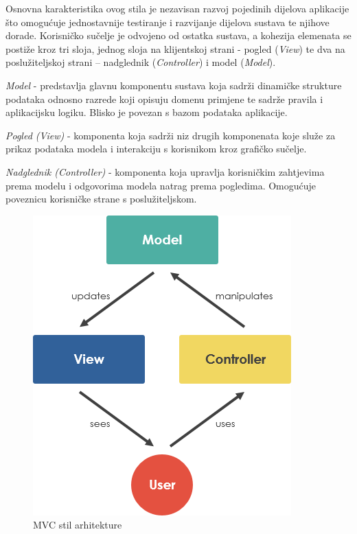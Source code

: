 		Osnovna	karakteristika ovog stila je	nezavisan razvoj	pojedinih dijelova aplikacije što omogućuje jednostavnije testiranje	i razvijanje dijelova sustava te	njihove	dorade.	
Korisničko	sučelje	je	odvojeno od	ostatka	sustava, a kohezija	elemenata se	postiže	kroz	
tri	sloja, jednog sloja	na klijentskoj strani - pogled (\textit{View}) te dva na	poslužiteljskoj	strani	
– nadglednik	(\textit{Controller})	i	model	(\textit{Model}).

		\begin{packed_enum}
			\item\textit{Model} - predstavlja glavnu komponentu sustava koja sadrži dinamičke strukture podataka odnosno razrede koji opisuju domenu primjene te sadrže pravila i aplikacijsku logiku. Blisko je povezan s bazom podataka aplikacije.
			\item\textit{Pogled (View)} - komponenta koja sadrži niz drugih komponenata koje služe za prikaz podataka modela i interakciju s korisnikom kroz grafičko sučelje.
			\item\textit{Nadglednik (Controller)} - komponenta koja upravlja korisničkim zahtjevima prema modelu i odgovorima modela natrag prema pogledima. Omogućuje poveznicu korisničke strane	s poslužiteljskom.
		\end{packed_enum}

		\begin{figure}[H]
			\includegraphics[scale=0.7]{slike/mvc-framework.PNG} 
			\centering
			\caption{MVC stil arhitekture}
			\label{pawBoost}
		\end{figure}
	
